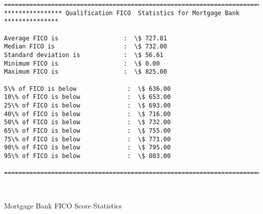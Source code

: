 \documentclass[11pt]{article}
\begin{document}
    \begin{Verbatim}[commandchars=\\\{\}]
=======================================================================
**************** Qualification FICO  Statistics for Mortgage Bank ***************
 
Average FICO is                  :  \$ 727.81
Median FICO is                   :  \$ 732.00
Standard deviation is            :  \$ 56.61
Minimum FICO is                  :  \$ 0.00
Maximum FICO is                  :  \$ 825.00
 
5\% of FICO is below              :  \$ 636.00
10\% of FICO is below             :  \$ 653.00
25\% of FICO is below             :  \$ 693.00
40\% of FICO is below             :  \$ 716.00
50\% of FICO is below             :  \$ 732.00
65\% of FICO is below             :  \$ 755.00
75\% of FICO is below             :  \$ 771.00
90\% of FICO is below             :  \$ 795.00
95\% of FICO is below             :  \$ 803.00
 
==========================================================================

    \end{Verbatim}

    \begin{center}
    \end{center}
    { \hspace*{\fill} \\}
    
    Mortgage Bank FICO Score Statistics
\end{document}

